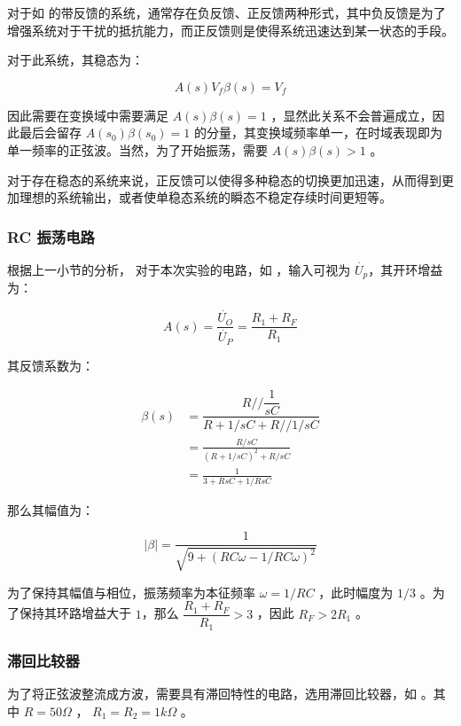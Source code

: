 \documentclass[lang=cn,11pt,a4paper,cite=authoryear]{elegantpaper}
\begin{document}
对于如  的带反馈的系统，通常存在负反馈、正反馈两种形式，其中负反馈是为了增强系统对于干扰的抵抗能力，而正反馈则是使得系统迅速达到某一状态的手段。

对于此系统，其稳态为：

\[A(s) V_f \beta(s) = V_f\]

因此需要在变换域中需要满足 \(A(s) \beta(s) = 1\) ，显然此关系不会普遍成立，因此最后会留存 \(A(s_0) \beta(s_0) = 1\)  的分量，其变换域频率单一，在时域表现即为单一频率的正弦波。当然，为了开始振荡，需要 \(A(s) \beta(s) > 1\) 。

对于存在稳态的系统来说，正反馈可以使得多种稳态的切换更加迅速，从而得到更加理想的系统输出，或者使单稳态系统的瞬态不稳定存续时间更短等。


\subsubsection{RC 振荡电路}

根据上一小节的分析， 对于本次实验的电路，如  ，输入可视为 \(\dot{U_p}\)，其开环增益为：

\[A(s) = \dfrac{\dot{U_O}}{\dot{U_P}} = \dfrac{R_1 + R_F}{R_1}\]

其反馈系数为： 

\[\begin{aligned}
    \beta(s) &= \dfrac{R // \dfrac{1}{sC}}{R + {1}/{sC} + R // {1}/{sC}} \\ 
    &= \frac{R / sC}{(R + 1 / sC)^2 + R / sC} \\ 
    &= \frac{1}{3 + RsC + 1 / RsC}
\end{aligned} \]

那么其幅值为：

\[|\beta| = \frac{1}{\sqrt{9 + (RC\omega - 1/RC\omega)^2}}\]

为了保持其幅值与相位，振荡频率为本征频率 \(\omega = 1 / RC\) ，此时幅度为 \(1 / 3\) 。为了保持其环路增益大于 \(1\)，那么 \(\dfrac{R_1 + R_F}{R_1} > 3\) ，因此 \(R_F > 2 R_1\) 。


\subsubsection{滞回比较器}

为了将正弦波整流成方波，需要具有滞回特性的电路，选用滞回比较器，如  。其中 \(R = 50 \Omega\) ， \(R_1 = R_2 = 1 k\Omega\) 。
\end{document}
